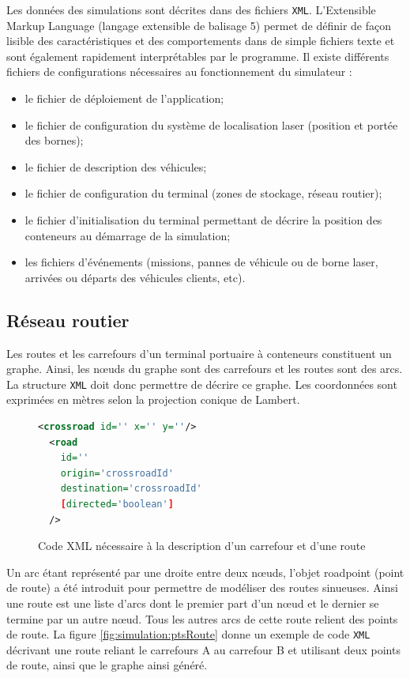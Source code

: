 Les données des simulations sont décrites dans des fichiers \verb!XML!. L'Extensible Markup Language (langage extensible de balisage 5) permet de définir de façon lisible des caractéristiques et des comportements dans de simple fichiers texte et sont également rapidement interprétables par le programme. Il existe différents fichiers de configurations nécessaires au fonctionnement du simulateur :
\begin{itemize}
 \item le fichier de déploiement de l'application;
 \item le fichier de configuration du système de localisation laser (position et portée des bornes);
 \item le fichier de description des véhicules;
 \item le fichier de configuration du terminal (zones de stockage, réseau routier);
 \item le fichier d'initialisation du terminal permettant de décrire la position des conteneurs au démarrage de la simulation;
 \item les fichiers d'événements (missions, pannes de véhicule ou de borne laser, arrivées ou départs des véhicules clients, etc).
\end{itemize}

\subsection{Réseau routier}\label{sec:description:resRoutier}

Les routes et les carrefours d'un terminal portuaire à conteneurs constituent un graphe. Ainsi, les n\oe{}uds du graphe sont des carrefours et les routes sont des arcs. La structure \verb!XML! doit donc permettre de décrire ce graphe. Les coordonnées sont exprimées en mètres selon la projection conique de Lambert.

\begin{figure}[h]
 
\begin{lstlisting}[language=XML]
  <crossroad id='' x='' y=''/>
  <road
    id=''
    origin='crossroadId'
    destination='crossroadId'
    [directed='boolean']
  />
\end{lstlisting}
\caption{Code XML nécessaire à la description d'un carrefour et d'une route}
\label{fig:simulation:carrefourRoute}
\end{figure}

Un arc étant représenté par une droite entre deux n\oe{}uds, l'objet roadpoint (point de route) a été introduit pour permettre de modéliser des routes sinueuses. Ainsi une route est une liste d'arcs dont le premier part d'un n\oe{}ud et le dernier se termine par un autre n\oe{}ud. Tous les autres arcs de cette route relient des points de route. La figure \ref{fig:simulation:ptsRoute} donne un exemple de code \verb!XML! décrivant une route reliant le carrefours A au carrefour B et utilisant deux points de route, ainsi que le graphe ainsi généré.

